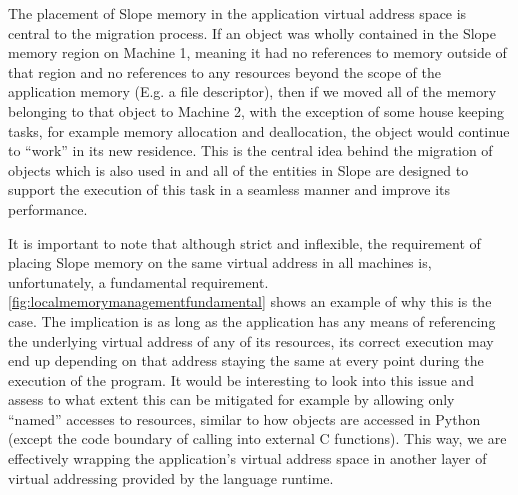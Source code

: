 The placement of Slope memory in the application virtual address space is
central to the migration process.  If an object was wholly contained
in the Slope memory region on Machine 1, meaning it had no references to memory
outside
of that region and no references to any resources beyond the
scope of the application memory (E.g. a file descriptor), then if we moved all
of the memory belonging to that object to Machine 2, with the exception of
some house keeping tasks, for example memory allocation and deallocation, the
object would continue to ``work'' in its new residence.
This is the central
idea behind the migration of objects which is also used in \cite{memon2018ramp}
and all of the entities in Slope are designed
to support the execution of this task in a seamless manner and improve its
performance.

It is important to note that although strict and inflexible, the requirement of
placing Slope memory on the same virtual address in all machines is,
unfortunately, a fundamental requirement. \autoref{fig:localmemorymanagementfundamental}
shows an example of why this is the case. The implication is as long as the
application has any means of referencing the underlying virtual address of any
of its resources, its correct execution may end up depending on that address
staying the same at every point during the execution of the program. It would
be interesting to look into this issue and assess to what extent this can be
mitigated for example by allowing only ``named'' accesses to resources, similar
to how objects are accessed in Python (except the code boundary of calling into
external C functions). This way, we are effectively wrapping the application's
virtual address space in another layer of virtual addressing provided by the
language runtime.


